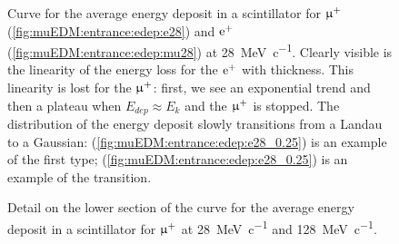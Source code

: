 \begin{refsection}
\begin{figure}
            \caption{Curve for the average energy deposit in a  scintillator for $\upmu^+$ (\ref{fig:muEDM:entrance:edep:e28}) and $\text{e}^+$ (\ref{fig:muEDM:entrance:edep:mu28}) at \SI{28}{MeV\per c}. Clearly visible is the linearity of the energy loss for the $\text{e}^+$ with thickness. This linearity is lost for the $\upmu^+$: first, we see an exponential trend and then a plateau when $E_{dep}\approx E_k$ and the $\upmu^+$ is stopped. The distribution of the energy deposit slowly transitions from a Landau to a Gaussian: (\ref{fig:muEDM:entrance:edep:e28_0.25}) is an example of the first type; (\ref{fig:muEDM:entrance:edep:e28_0.25}) is an example of the transition.}
            \label{fig:muEDM:entrance:edep}
        \end{figure}
        
        \begin{figure}   
            \centering
            \hfill
            \caption{Detail on the lower section of the curve for the average energy deposit in a  scintillator for $\upmu^+$ at \SI{28}{MeV\per c} and \SI{128}{MeV\per c}.}
            \label{fig:muEDM:entrance:edep:log}
        \end{figure}


\end{refsection}
